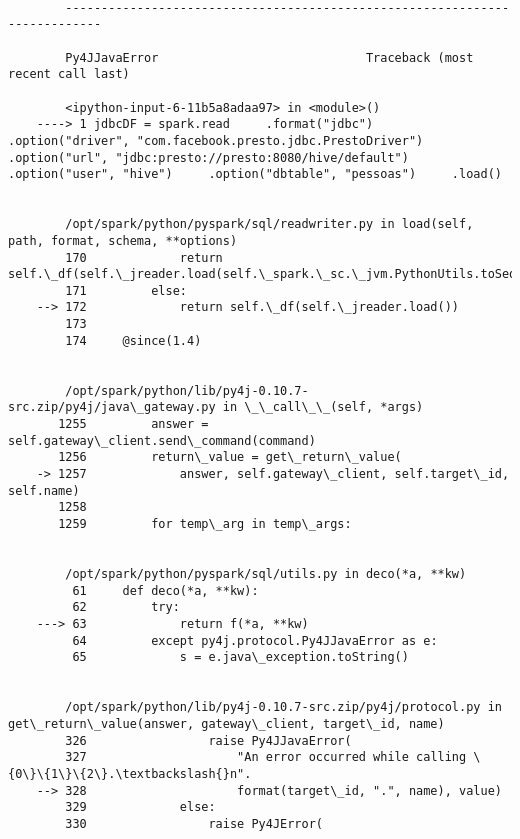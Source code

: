 \documentclass[11pt]{article}
\begin{document}
    \begin{Verbatim}[commandchars=\\\{\}]

        ---------------------------------------------------------------------------

        Py4JJavaError                             Traceback (most recent call last)

        <ipython-input-6-11b5a8adaa97> in <module>()
    ----> 1 jdbcDF = spark.read     .format("jdbc")     .option("driver", "com.facebook.presto.jdbc.PrestoDriver")     .option("url", "jdbc:presto://presto:8080/hive/default")     .option("user", "hive")     .option("dbtable", "pessoas")     .load()
    

        /opt/spark/python/pyspark/sql/readwriter.py in load(self, path, format, schema, **options)
        170             return self.\_df(self.\_jreader.load(self.\_spark.\_sc.\_jvm.PythonUtils.toSeq(path)))
        171         else:
    --> 172             return self.\_df(self.\_jreader.load())
        173 
        174     @since(1.4)


        /opt/spark/python/lib/py4j-0.10.7-src.zip/py4j/java\_gateway.py in \_\_call\_\_(self, *args)
       1255         answer = self.gateway\_client.send\_command(command)
       1256         return\_value = get\_return\_value(
    -> 1257             answer, self.gateway\_client, self.target\_id, self.name)
       1258 
       1259         for temp\_arg in temp\_args:


        /opt/spark/python/pyspark/sql/utils.py in deco(*a, **kw)
         61     def deco(*a, **kw):
         62         try:
    ---> 63             return f(*a, **kw)
         64         except py4j.protocol.Py4JJavaError as e:
         65             s = e.java\_exception.toString()


        /opt/spark/python/lib/py4j-0.10.7-src.zip/py4j/protocol.py in get\_return\_value(answer, gateway\_client, target\_id, name)
        326                 raise Py4JJavaError(
        327                     "An error occurred while calling \{0\}\{1\}\{2\}.\textbackslash{}n".
    --> 328                     format(target\_id, ".", name), value)
        329             else:
        330                 raise Py4JError(



\end{Verbatim}
\end{document}
